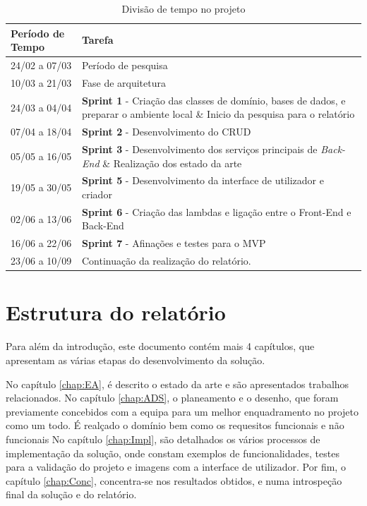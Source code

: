 \begin{table}[H]  %
\caption{Divisão de tempo no projeto}
\label{tab:tempo_projeto}
\begin{center}
\begin{tabular}{|l|p{10cm}|}
\hline
\textbf{Período de Tempo} & \textbf{Tarefa} \\ \hline
24/02 a 07/03 & Período de pesquisa \\ \hline
10/03 a 21/03 & Fase de arquitetura \\ \hline
24/03 a 04/04 & \textbf{Sprint 1} - Criação das classes de domínio, bases de dados, e preparar o ambiente local \& Inicio da pesquisa para o relatório \\ \hline
07/04 a 18/04 & \textbf{Sprint 2} - Desenvolvimento do \gls{CRUD} \\ \hline
05/05 a 16/05 & \textbf{Sprint 3} - Desenvolvimento dos serviços principais de \textit{Back-End} \& Realização dos estado da arte \\ \hline
19/05 a 30/05 & \textbf{Sprint 5} - Desenvolvimento da interface de utilizador e criador \\ \hline
02/06 a 13/06 & \textbf{Sprint 6} - Criação das lambdas e ligação entre o Front-End e Back-End \\ \hline
16/06 a 22/06 & \textbf{Sprint 7} - Afinações e testes para o \gls{MVP} \\ \hline
23/06 a 10/09 & Continuação da realização do relatório. \\ \hline
\end{tabular}
\end{center}
\end{table}




\section{Estrutura do relatório}


Para além da introdução, este documento contém mais 4 capítulos, que apresentam as várias etapas do desenvolvimento da solução. 

No capítulo \ref{chap:EA}, é descrito o estado da arte e são apresentados trabalhos relacionados. No capítulo \ref{chap:ADS}, o planeamento e o desenho, que foram previamente concebidos com a equipa para um melhor enquadramento no projeto como um todo. É realçado o domínio bem como os requesitos funcionais e não funcionais No capítulo \ref{chap:Impl}, são detalhados os vários processos de implementação da solução, onde constam exemplos de funcionalidades, testes para a validação do projeto e imagens com a interface de utilizador. Por fim, o capítulo \ref{chap:Conc}, concentra-se nos resultados obtidos, e numa introspeção final da solução e do relatório.

\vspace{20mm} 
